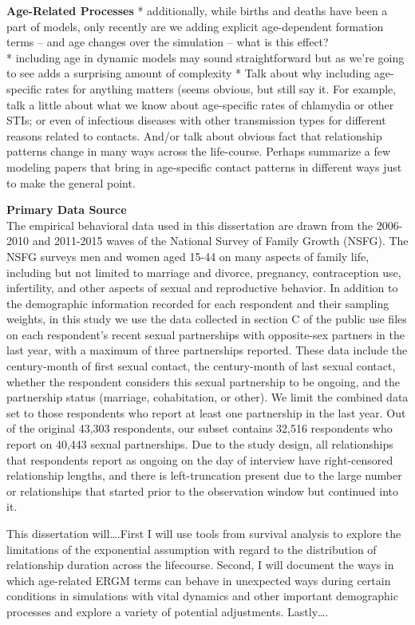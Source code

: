 \documentclass [11pt, proquest] {uwthesis}[2015/03/03]
\begin{document}
\textbf{Age-Related Processes}
* additionally, while births and deaths have been a part of models, only recently are we adding explicit age-dependent formation terms -- and age changes over the simulation -- what is this effect?\\
* including age in dynamic models may sound straightforward but as we're going to see adds a surprising amount of complexity
* Talk about why including age-specific rates for anything matters (seems obvious, but still say it. For example, talk a little about what we know about age-specific rates of chlamydia or other STIs; or even of infectious diseases with other transmission types for different reasons related to contacts. And/or talk about obvious fact that relationship patterns change in many ways across the life-course. Perhaps summarize a few modeling papers that bring in age-specific contact patterns in different ways just to make the general point.

\textbf{Primary Data Source}\\
The empirical behavioral data used in this dissertation are drawn from the 2006-2010 and 2011-2015 waves of the National Survey of Family Growth (NSFG). The NSFG surveys men and women aged 15-44 on many aspects of family life, including but not limited to marriage and divorce, pregnancy, contraception use, infertility, and other aspects of sexual and reproductive behavior. In addition to the demographic information recorded for each respondent and their sampling weights, in this study we use the data collected in section C of the public use files on each respondent's recent sexual partnerships with opposite-sex partners in the last year, with a maximum of three partnerships reported. These data include the century-month of first sexual contact, the century-month of last sexual contact, whether the respondent considers this sexual partnership to be ongoing, and the partnership status (marriage, cohabitation, or other). We limit the combined data set to those respondents who report at least one partnership in the last year. Out of the original 43,303 respondents, our subset contains 32,516 respondents who report on 40,443 sexual partnerships. Due to the study design, all relationships that respondents report as ongoing on the day of interview have right-censored relationship lengths, and there is left-truncation present due to the large number or relationships that started prior to the observation window but continued into it.

This dissertation will\ldots.First I will use tools from survival analysis to explore the limitations of the exponential assumption with regard to the distribution of relationship duration across the lifecourse. Second, I will document the ways in which age-related ERGM terms can behave in unexpected ways during certain conditions in simulations with vital dynamics and other important demographic processes and explore a variety of potential adjustments. Lastly\ldots.
\end{document}
